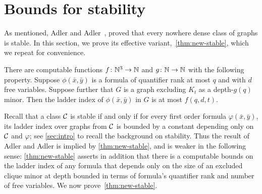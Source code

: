
\section{Bounds for stability}\label{sec:stable}
As mentioned, Adler and Adler~\cite{adler2014interpreting}, 
proved that every nowhere dense class of graphs is stable. In this section,
we prove its effective variant,~\cref{thm:new-stable}, which 
we repeat for convenience.
 \setcounter{aux}{\thetheorem}
 \setcounter{theorem}{\thestable}
 \begin{theorem}
 There are computable functions $f\colon \N^3\to\N$ and $g\colon\N\to\N$ with the following property.
 Suppose $\phi(\bar x,\bar y)$ is a formula of quantifier rank at most $q$ and with $d$ free variables.
 Suppose further that $G$ is a graph excluding $K_t$ as a depth-$g(q)$ minor. Then the ladder index of $\phi(\bar x,\bar y)$ in $G$ is at most $f(q,d,t)$.
 \end{theorem}
 \setcounter{theorem}{\theaux}

Recall that a class $\cal C$ is stable if and only if for every first order formula $\varphi(\bar x,\bar y)$, 
its ladder index over graphs from $\cal C$ is bounded by a constant depending only on $\cal C$ and $\varphi$;
see \cref{sec:intro} to recall the background on stability.
Thus the result of Adler and Adler is implied by \cref{thm:new-stable},
and is weaker in the following sense: \cref{thm:new-stable} asserts in addition that there is a computable bounds on the ladder index
of any formula that depends only on the size of an excluded clique minor at depth bounded in terms of formula's quantifier rank and number of free variables. 
We now prove~\cref{thm:new-stable}.

